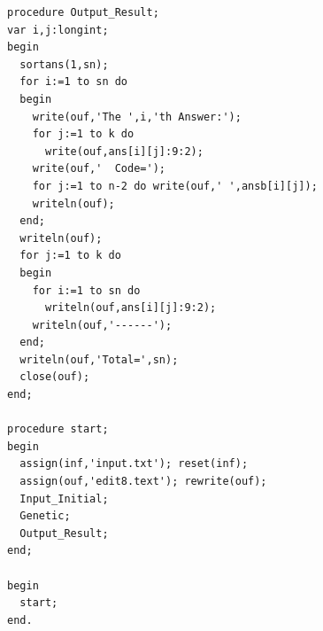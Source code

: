 \documentclass[11pt]{article}
\begin{document}
\begin{verbatim}
procedure Output_Result;
var i,j:longint;
begin
  sortans(1,sn);
  for i:=1 to sn do
  begin
    write(ouf,'The ',i,'th Answer:');
    for j:=1 to k do
      write(ouf,ans[i][j]:9:2);
    write(ouf,'  Code=');
    for j:=1 to n-2 do write(ouf,' ',ansb[i][j]);
    writeln(ouf);
  end;
  writeln(ouf);
  for j:=1 to k do
  begin
    for i:=1 to sn do
      writeln(ouf,ans[i][j]:9:2);
    writeln(ouf,'------');
  end;
  writeln(ouf,'Total=',sn);
  close(ouf);
end;

procedure start;
begin
  assign(inf,'input.txt'); reset(inf);
  assign(ouf,'edit8.text'); rewrite(ouf);
  Input_Initial;
  Genetic;
  Output_Result;
end;

begin
  start;
end.
\end{verbatim}
\end{document}
